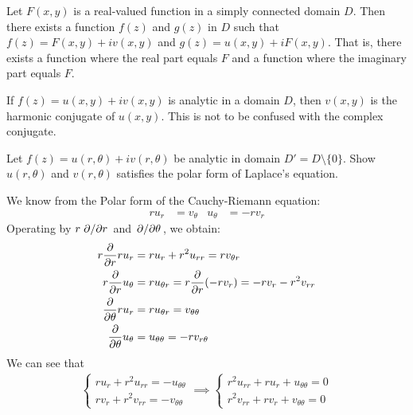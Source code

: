 \documentclass[12pt, english]{book}
\makeatletter
\renewenvironment{proof}[1][\proofname]{\par
	\pushQED{\qed}%
	\normalfont \topsep6\p@\@plus6\p@\relax
	\list{}{%
		\settowidth{\leftmargin}{\itshape\proofname:\hskip\labelsep}%
		\setlength{\labelwidth}{0pt}%
		\setlength{\itemindent}{-\leftmargin}%
	}%
	\item[\hskip\labelsep\itshape#1\@addpunct{:}]\ignorespaces
	}{ \popQED\endlist\@endpefalse}
\makeatother
\begin{document}
	\begin{corollary}
		Let \(F(x,y)\) is a real-valued function in a simply connected domain \(D\). Then there exists a function \(f(z)\) and \(g(z)\) in \(D\) such that \(f(z) = F(x,y) + iv(x,y)\) and \(g(z) = u(x,y) + iF(x,y)\). That is, there exists a function where the real part equals \(F\) and a function where the imaginary part equals \(F\).
	\end{corollary}

	\begin{definition} 
		\label{Harmonic Conjugate Definition - Complex}
		If \(f(z) = u(x,y) + iv(x,y)\) is analytic in a domain \(D\), then \(v(x,y)\) is the harmonic conjugate of \(u(x,y)\). This is not to be confused with the complex conjugate.
	\end{definition}
	
	\begin{example}
		\label{Laplace's Equation (Polar) Exercise - Complex}
		Let \(f(z) = u(r, \theta) + iv(r, \theta)\) be analytic in domain \(D' = D \setminus \{0\}\). Show \(u(r, \theta)\) and \(v(r, \theta)\) satisfies the polar form of Laplace's equation.
		\begin{proof}{\color{Grey}
			We know from the Polar form of the Cauchy-Riemann equation:
			\begin{align*}
				ru_r &= v_\theta & u_\theta &= -rv_r
			\end{align*}
			Operating by \(r \pdv*{r}\) and \(\pdv*{\theta}\), we obtain:
			\begin{align*}
				r \pdv{r} r u_r &= ru_r + r^2 u_{rr} = r v_{\theta r} \\
				r \pdv{r} u_\theta &= ru_{\theta r} = r \pdv{r} (-rv_r) = -rv_r - r^2v_{rr} \\
				\pdv{\theta} ru_{r} &= r u_{\theta r} = v_{\theta \theta} \\
				\pdv{\theta} u_\theta &= u_{\theta \theta} = -r v_{r \theta}
			\end{align*}
			We can see that 
			\begin{align*}
				\begin{cases}
					ru_r + r^2 u_{rr} = -u_{\theta \theta} \\
					rv_r + r^2 v_{rr} = -v_{\theta \theta}
				\end{cases}
				\implies
				\begin{cases}
					r^2 u_{rr} + ru_r + u_{\theta \theta} = 0 \\
					r^2 v_{rr} + rv_r + v_{\theta \theta} = 0
				\end{cases}
			\end{align*}
			}
		\end{proof}
	\end{example}
\end{document}
